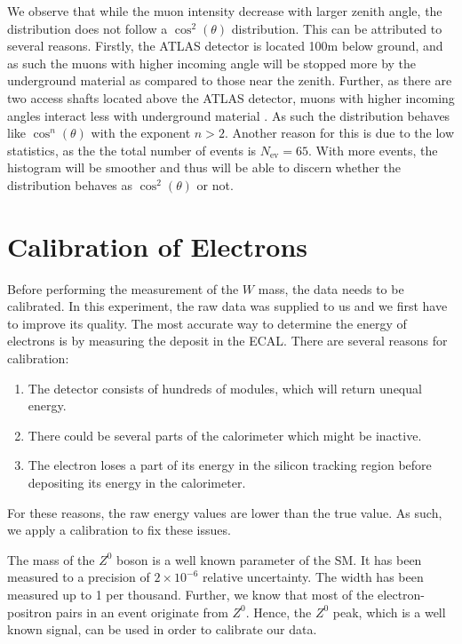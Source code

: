\documentclass[a4paper]{report}
\numberwithin{equation}{section}
\begin{document}
We observe that while the muon intensity decrease with larger zenith angle, 
the distribution does not follow a $\cos^2 (\theta)$ distribution. This can be attributed to several reasons. Firstly, the ATLAS detector 
is located 100m below ground, and as such the muons with higher incoming angle will be stopped more by the underground material 
as compared to those near the zenith. Further, as there are two access shafts located above the ATLAS detector, muons with higher 
incoming angles interact less with underground material  \cite{Aad2011}. As such the distribution behaves like $\cos^n (\theta)$ with 
the exponent $n > 2$. Another reason for this is due to the low statistics, as the the total number of events is $N_{\mathrm{ev}} = 65$. 
With more events, the histogram will be smoother and thus will be able to discern whether the distribution behaves as $\cos^2(\theta)$
or not.\par 


\chapter{Calibration of Electrons} \label{chap:elec_calib}

Before performing the measurement of the $W$ mass, the data needs to be calibrated. In this experiment, the raw data was supplied to us and we first have to improve its quality. The most accurate way to determine the energy of electrons is by measuring the deposit in the ECAL. There are several reasons for calibration:

\begin{enumerate}
	\item The detector consists of hundreds of modules, which will return unequal energy. 
	\item There could be several parts of the calorimeter which might be inactive. 
	\item The electron loses a part of its energy in the silicon tracking region before depositing its energy in the calorimeter. 
\end{enumerate}
For these reasons, the raw energy values are lower than the true value. As such, we apply a calibration to fix these issues.

The mass of the $Z^0$ boson is a well known parameter of the SM. It has been measured to a precision of $2 \times 10^{-6}$ relative uncertainty. The width has been measured up to 1 per thousand. Further, we know that most of the electron-positron pairs in an event originate from $Z^0$. Hence, the $Z^0$ peak, which is a well known signal, can be used in order to calibrate our data. 
\end{document}
